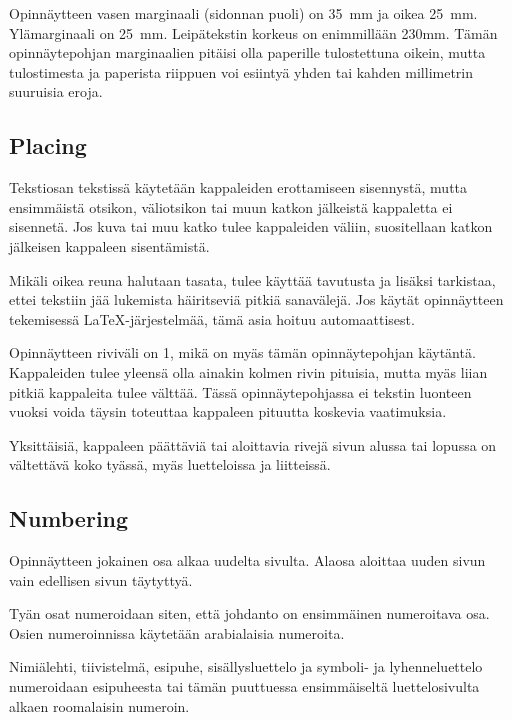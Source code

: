 \documentclass[english,12pt,a4paper,pdftex]{article}
\begin{document}
Opinnäytteen vasen marginaali (sidonnan puoli) on
35~mm %
ja oikea 25~mm. Ylämarginaali on 25~mm. Leipätekstin korkeus on
enimmillään 230mm. Tämän opinnäytepohjan marginaalien pitäisi olla
paperille tulostettuna oikein, mutta tulostimesta ja paperista
riippuen voi esiintyä yhden tai kahden millimetrin suuruisia eroja.
\subsection*{Placing}

Tekstiosan tekstissä käytetään kappaleiden erottamiseen sisennystä,
mutta ensimmäistä otsikon, väliotsikon tai muun katkon jälkeistä
kappaletta ei sisennetä. Jos kuva tai muu katko tulee kappaleiden
väliin, suositellaan katkon jälkeisen kappaleen sisentämistä.

Mikäli oikea reuna halutaan tasata, tulee käyttää tavutusta ja lisäksi
tarkistaa, ettei tekstiin jää lukemista häiritseviä pitkiä sanavälejä. Jos
käytät opinnäytteen tekemisessä \LaTeX-järjestelmää,
tämä asia hoituu automaattisest.

Opinnäytteen riviväli on 1, mikä on myäs tämän opinnäytepohjan käytäntä.
Kappaleiden tulee yleensä olla ainakin kolmen rivin pituisia, mutta
myäs liian pitkiä kappaleita tulee välttää.  Tässä opinnäytepohjassa
ei tekstin luonteen vuoksi voida täysin toteuttaa kappaleen pituutta koskevia
vaatimuksia.

Yksittäisiä, kappaleen päättäviä tai aloittavia rivejä sivun alussa
tai lopussa on vältettävä koko tyässä, myäs luetteloissa ja
liitteissä.

\subsection*{Numbering}

Opinnäytteen jokainen osa alkaa uudelta sivulta. Alaosa aloittaa uuden
sivun vain edellisen sivun täytyttyä.

Tyän osat numeroidaan siten, että johdanto on ensimmäinen numeroitava
osa. Osien numeroinnissa käytetään arabialaisia numeroita.

Nimiälehti, tiivistelmä, esipuhe, sisällysluettelo ja symboli- ja
lyhenneluettelo numeroidaan esipuheesta tai tämän puuttuessa
ensimmäiseltä luettelosivulta alkaen roomalaisin numeroin.
\end{document}
